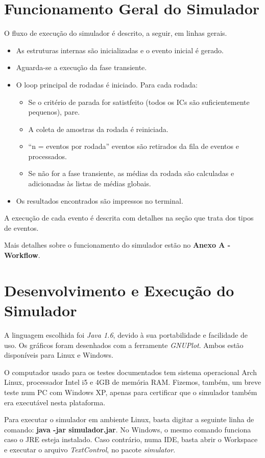 \documentclass[a4paper,12pt]{report}
\begin{document}
\section{Funcionamento Geral do Simulador}
O fluxo de execução do simulador é descrito, a seguir, em linhas gerais.
\begin{itemize}
  \item As estruturas internas são inicializadas e o evento inicial é gerado.
  \item Aguarda-se a execução da fase transiente.
  \item O loop principal de rodadas é iniciado. Para cada rodada:
  \begin{itemize}
    \item Se o critério de parada for satistfeito (todos os ICs são suficientemente pequenos), pare.
    \item A coleta de amostras da rodada é reiniciada.
    \item “n = eventos por rodada” eventos são retirados da fila de eventos e processados.
    \item Se não for a fase transiente, as médias da rodada são calculadas e adicionadas às listas de médias globais.
\end{itemize}
  \item Os resultados encontrados são impressos no terminal.
\end{itemize}

A execução de cada evento é descrita com detalhes na seção que trata dos tipos de eventos.

Mais detalhes sobre o funcionamento do simulador estão no \textbf{Anexo A - Workflow}.

\section{Desenvolvimento e Execução do Simulador}
A linguagem escolhida foi \textit{Java 1.6}, devido à sua portabilidade e facilidade de uso. Os gráficos foram desenhados com a ferramente \textit{GNUPlot}. Ambos estão disponíveis para Linux e Windows.

O computador usado para os testes documentados tem sistema operacional Arch Linux, processador Intel i5 e 4GB de memória RAM. Fizemos, também, um breve teste num PC com Windows XP, apenas para certificar que o simulador também era executável nesta plataforma.

Para executar o simulador em ambiente Linux, basta digitar a seguinte linha de comando: \textbf{java -jar simulador.jar}. No Windows, o mesmo comando funciona caso o JRE esteja instalado. Caso contrário, numa IDE, basta abrir o Workspace e executar o arquivo \textit{TextControl}, no pacote \textit{simulator}.
\end{document}
